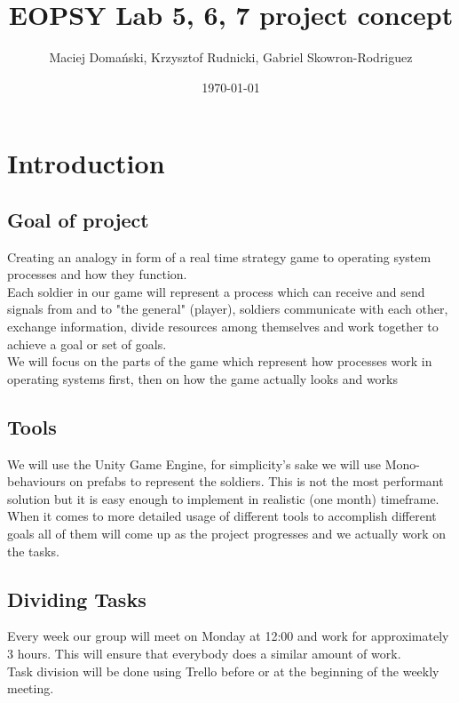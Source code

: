 \documentclass{article}
\title{EOPSY Lab 5, 6, 7 project concept}
\author{Maciej Domański, Krzysztof Rudnicki, Gabriel Skowron-Rodriguez}
\date{\today}
\begin{document}
\maketitle

\section{Introduction}

\subsection{Goal of project}
Creating an analogy in form of a real time strategy game to operating system processes and how they function. \\
Each soldier in our game will represent a process which can receive and send signals from and to "the general" (player), soldiers communicate with each other, exchange information, divide resources among themselves and work together to achieve a goal or set of goals. \\
We will focus on the parts of the game which represent how processes work in operating systems first, then on how the game actually looks and works

\subsection{Tools}
We will use the Unity Game Engine, for simplicity's sake we will use Mono-behaviours on prefabs to represent the soldiers. This is not the most performant solution but it is easy enough to implement in realistic (one month) timeframe.\\
When it comes to more detailed usage of different tools to accomplish different goals all of them will come up as the project progresses and we actually work on the tasks.

\subsection{Dividing Tasks}
Every week our group will meet on Monday at 12:00 and work for approximately 3 hours. This will ensure that everybody does a similar amount of work. \\
Task division will be done using Trello before or at the beginning of the weekly meeting.

\newpage
\end{document}

